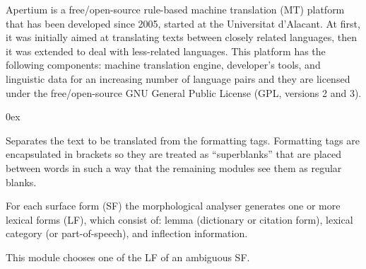\documentclass[11pt]{article}
\begin{document}
Apertium \citep{forcada11} is a free/open-source rule-based machine translation (MT) platform that 
has been developed since 2005, started at the Universitat d'Alacant. At first, it was initially aimed at 
translating texts between closely related languages, then it was extended to deal with less-related 
languages. This platform has the following components: machine translation engine, developer's tools, and linguistic 
data for an increasing number of language pairs and they are licensed under the 
free/open-source GNU General Public License (GPL, versions 2 and 3).
\begin{description}\itemsep 0ex
\item[De-formatter:] Separates the text to be translated from the formatting tags.  Formatting tags are 
  encapsulated in brackets so they are treated as ``superblanks'' that are placed between words in 
  such a way that the remaining modules see them as regular blanks.  
\item[Morphological analyser:] For each surface form  (SF) the morphological analyser generates one or more 
  lexical forms (LF), which consist of: lemma (dictionary or citation form), lexical category (or part-of-speech), 
  and inflection information. 
\item[Part-of-speech (POS) tagger:] This module chooses one of the LF of an ambiguous SF. 

\end{description}
\end{document}
